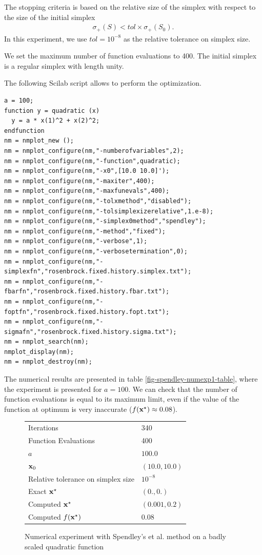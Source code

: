 The stopping criteria is based on the relative size of the simplex 
with respect to the size of the initial simplex 
\begin{eqnarray}
\sigma_+(S) < tol \times \sigma_+(S_0).
\end{eqnarray}
In this experiment, we use $tol=10^{-8}$ as the relative tolerance 
on simplex size.

We set the maximum number of function evaluations to 400.
The initial simplex is a regular simplex with length unity.

The following Scilab script allows to perform the optimization.

\lstset{language=scilabscript}
\begin{lstlisting}
a = 100;
function y = quadratic (x)
  y = a * x(1)^2 + x(2)^2;
endfunction
nm = nmplot_new ();
nm = nmplot_configure(nm,"-numberofvariables",2);
nm = nmplot_configure(nm,"-function",quadratic);
nm = nmplot_configure(nm,"-x0",[10.0 10.0]');
nm = nmplot_configure(nm,"-maxiter",400);
nm = nmplot_configure(nm,"-maxfunevals",400);
nm = nmplot_configure(nm,"-tolxmethod","disabled");
nm = nmplot_configure(nm,"-tolsimplexizerelative",1.e-8);
nm = nmplot_configure(nm,"-simplex0method","spendley");
nm = nmplot_configure(nm,"-method","fixed");
nm = nmplot_configure(nm,"-verbose",1);
nm = nmplot_configure(nm,"-verbosetermination",0);
nm = nmplot_configure(nm,"-simplexfn","rosenbrock.fixed.history.simplex.txt");
nm = nmplot_configure(nm,"-fbarfn","rosenbrock.fixed.history.fbar.txt");
nm = nmplot_configure(nm,"-foptfn","rosenbrock.fixed.history.fopt.txt");
nm = nmplot_configure(nm,"-sigmafn","rosenbrock.fixed.history.sigma.txt");
nm = nmplot_search(nm);
nmplot_display(nm);
nm = nmplot_destroy(nm);
\end{lstlisting}


The numerical results are presented in table \ref{fig-spendley-numexp1-table},
where the experiment is presented for $a=100$. We can check that the 
number of function evaluations is equal to its maximum limit, even if the value of the 
function at optimum is very inaccurate ($f(\mathbf{x}^\star) \approx 0.08$).

\begin{figure}[h]
\begin{center}
\begin{tabular}{|l|l|}
\hline
Iterations & 340 \\
Function Evaluations & 400 \\
$a$ & $100.0$ \\
$\mathbf{x}_0$ & $(10.0,10.0)$ \\
Relative tolerance on simplex size & $10^{-8}$ \\
Exact $\mathbf{x}^\star$ & $(0.,0.)$\\
Computed $\mathbf{x}^\star$ & $(0.001,0.2)$\\
Computed $f(\mathbf{x}^\star)$ & $0.08$\\
\hline
\end{tabular}
\end{center}
\caption{Numerical experiment with Spendley's et al. method on a badly scaled quadratic function}
\label{fig-spendley-numexp2-table}
\end{figure}

